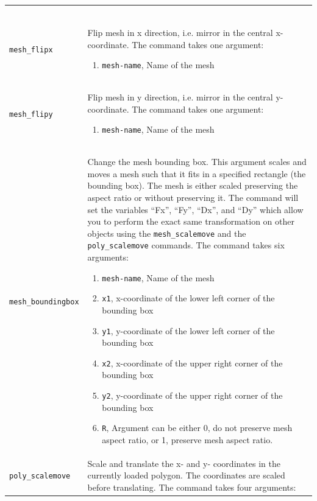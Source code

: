 \documentclass[noshowpacs,preprintnumbers,amsmath,amssymb, letter]{revtex4}
\begin{document}
\begin{longtable}{p{}p{}}
\begin{enumerate}
\end{enumerate}\\
\texttt{mesh\_flipx} 	& Flip mesh in x direction, i.e. mirror in the central x-coordinate. The command takes one argument:
\begin{enumerate}
\item \texttt{mesh-name}, Name of the mesh
\end{enumerate}\\
\texttt{mesh\_flipy} 	& Flip mesh in y direction, i.e. mirror in the central y-coordinate. The command takes one argument:
\begin{enumerate}
\item \texttt{mesh-name}, Name of the mesh
\end{enumerate}\\
\texttt{mesh\_boundingbox} 	& Change the mesh bounding box. This argument scales and moves a mesh such that it fits in a specified rectangle (the bounding box). The mesh is either scaled preserving the aspect ratio or without preserving it. The command will set the variables ``Fx'', ``Fy'', ``Dx'', and ``Dy'' which allow you to perform the exact same transformation on other objects using the \texttt{mesh\_scalemove} and the \texttt{poly\_scalemove} commands. The command takes six arguments:
\begin{enumerate}
\item \texttt{mesh-name}, Name of the mesh
\item \texttt{x1}, x-coordinate of the lower left corner of the bounding box
\item \texttt{y1}, y-coordinate of the lower left corner of the bounding box
\item \texttt{x2}, x-coordinate of the upper right corner of the bounding box
\item \texttt{y2}, y-coordinate of the upper right corner of the bounding box
\item \texttt{R}, Argument can be either 0, do not preserve mesh aspect ratio, or 1, preserve mesh aspect ratio. 
\end{enumerate}\\
\texttt{poly\_scalemove} 	& Scale and translate the x- and y- coordinates in the currently loaded polygon. The coordinates are scaled before translating. The command takes four arguments:

\end{longtable}
\end{document}

